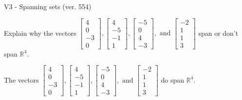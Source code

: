 \begin{exercise}
  \begin{exerciseTitle}V3 - Spanning sets (ver. 554)\end{exerciseTitle}
  \begin{exerciseStatement}
    Explain why the vectors \(\left[\begin{array}{r}
4 \\
0 \\
-3 \\
0
\end{array}\right] , \left[\begin{array}{r}
4 \\
-5 \\
-1 \\
1
\end{array}\right] , \left[\begin{array}{r}
-5 \\
0 \\
4 \\
-3
\end{array}\right] , \text{ and } \left[\begin{array}{r}
-2 \\
1 \\
1 \\
3
\end{array}\right]\) span or don't span \(\mathbb{R}^4\). 
	


  \end{exerciseStatement}
  \begin{exerciseAnswer}
   The vectors \(\left[\begin{array}{r}
4 \\
0 \\
-3 \\
0
\end{array}\right] , \left[\begin{array}{r}
4 \\
-5 \\
-1 \\
1
\end{array}\right] , \left[\begin{array}{r}
-5 \\
0 \\
4 \\
-3
\end{array}\right] , \text{ and } \left[\begin{array}{r}
-2 \\
1 \\
1 \\
3
\end{array}\right]\) 
  	 do  
	span \(\mathbb{R}^4\).
  


  \end{exerciseAnswer}
\end{exercise}